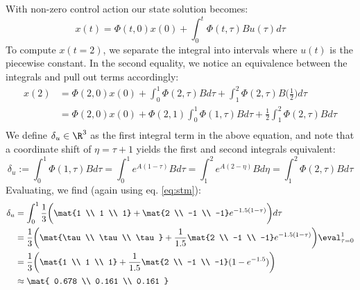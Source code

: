 \documentclass{homework}
\begin{document}
\begin{letterenum}
\item With non-zero control action our state solution becomes:
\begin{equation*}
    x(t) = \Phi(t, 0)x(0) + \int_{0}^{t} \Phi(t, \tau) B u(\tau) d\tau
\end{equation*}
To compute $x(t=2)$, we separate the integral into intervals where $u(t)$ is the piecewise constant.
In the second equality, we notice an equivalence between the integrals and pull out terms accordingly:
\begin{align*}
    x(2) &= \Phi(2, 0)x(0) + \int_{0}^{1} \Phi(2, \tau) B d\tau + \int_{1}^{2} \Phi(2, \tau) B \biggl(\frac{1}{2}\biggr) d\tau \\
        &= \Phi(2, 0)x(0) + \Phi(2, 1) \int_{0}^{1} \Phi(1, \tau) B d\tau
            + \frac{1}{2} \int_{1}^{2} \Phi(2, \tau) B d\tau \\
\end{align*}
We define $\delta_u\in\R^3$ as the first integral term in the above equation, and note that a coordinate
shift of $\eta = \tau + 1$ yields the first and second integrals equivalent:
\begin{equation*}
    \delta_u := \int_{0}^{1} \Phi(1, \tau) B d\tau 
        = \int_{0}^{1} e^{A(1 - \tau)} B d\tau
        = \int_{1}^{2} e^{A(2 - \eta)} B d\eta
        = \int_{1}^{2} \Phi(2, \tau) B d\tau
\end{equation*}
Evaluating, we find (again using eq. \ref{eq:stm}):
\begin{align*}
    \delta_u &= \int_{0}^{1} \frac{1}{3} \biggl(
        \mat{1 \\ 1 \\ 1} + \mat{2 \\ -1 \\ -1} e^{-1.5(1 - \tau)} 
    \biggr)d\tau \\
    &= \frac{1}{3} \biggl(
        \mat{\tau \\ \tau \\ \tau} + \frac{1}{1.5} \mat{2 \\ -1 \\ -1} e^{-1.5(1 - \tau)}
    \biggr)\eval_{\tau=0}^1 \\
    &= \frac{1}{3} \biggl(
        \mat{1 \\ 1 \\ 1} + \frac{1}{1.5} \mat{2 \\ -1 \\ -1} (1 - e^{-1.5})
    \biggr) \\
    &\approx \mat{
        0.678 \\ 0.161 \\ 0.161
    }
\end{align*}


\end{letterenum}
\end{document}
